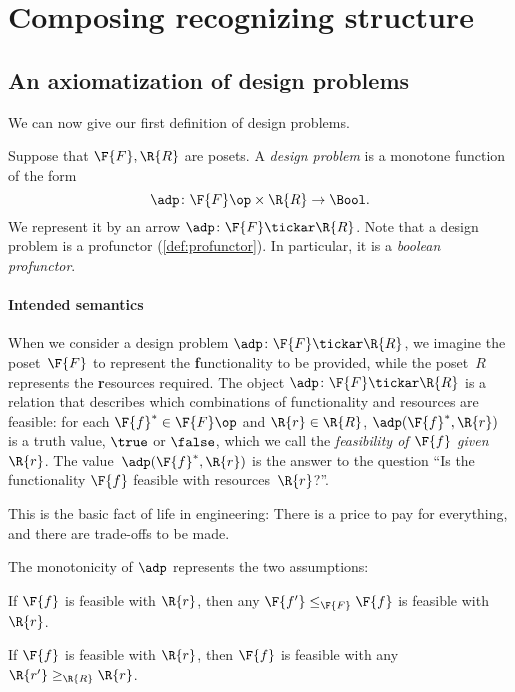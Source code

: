 \section{Composing recognizing structure}
\label{sec:dpdefinition}
\subsection{An axiomatization of design problems}
We can now give our first definition of design problems.



\begin{definition} \label{def:design-problem}
Suppose that $\F{F}, \R{R}$ are posets. A \emph{design problem} is a monotone function of the form
\begin{equation}
	\adp \colon  \F{F}\op \times \R{R} \to \Bool.
\end{equation}
We represent it by an arrow $\adp \colon \F{F} \tickar \R{R}$. Note that a design problem is a profunctor (\cref{def:profunctor}). In particular, it is a \emph{boolean profunctor}.
\end{definition}

\paragraph{Intended semantics}
When we consider a design problem $\adp\colon \F{F} \tickar \R{R}$, we imagine the poset~$\F{F}$ to represent the \textbf{f}unctionality to be provided, while the poset~$R$ represents the \textbf{r}esources required. The object $\adp \colon \F{F} \tickar \R{R}$ is a relation that describes which combinations of functionality and resources are feasible: for each $\F{f}^* \in \F{F}\op$ and $\R{r} \in \R{R}$, $\adp(\F{f}^*,\R{r})$ is a truth value, $\true$ or $\false$, which we call the \emph{feasibility of $\F{f}$ given $\R{r}$}. The value~$\adp(\F{f}^*,\R{r})$ is the answer to the question ``Is the functionality $\F{f}$ feasible with resources~$\R{r}$?''.

\noindent This is the basic fact of life in engineering: There is a price to pay for everything, and there are trade-offs to be made.

\noindent The monotonicity of $\adp$ represents the two assumptions:

\begin{compactenum}
\item If $\F{f}$ is feasible with $\R{r}$, then any $\F{f'} \leq_\F{F} \F{f}$ is feasible with $\R{r}$.
\item If $\F{f}$ is feasible with $\R{r}$, then $\F{f}$ is feasible with any $\R{r'} \geq_\R{R} \R{r}$.
\end{compactenum}


